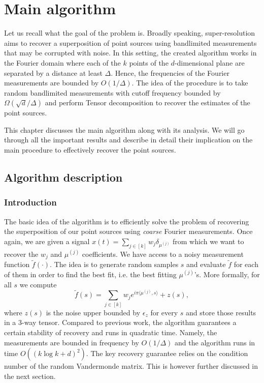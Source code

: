 \chapter{Main algorithm}
Let us recall what the goal of the problem is. Broadly speaking, super-resolution aims to recover a superposition of point sources using bandlimited measurements that may be corrupted with noise. In this setting, the created algorithm works in the Fourier domain where each of the $k$ points of the $d$-dimensional plane are separated by a distance at least $\Delta$. Hence, the frequencies of the Fourier measurements are bounded by $O(1/\Delta)$. The idea of the procedure is to take random bandlimited measurements with cutoff frequency bounded by $\Omega(\sqrt{d}/\Delta)$ and perform Tensor decomposition to recover the estimates of the point sources.\par 
This chapter discusses the main algorithm along with its analysis. We will go through all the important results and describe in detail their implication on the main procedure to effectively recover the point sources.

\section{Algorithm description}
\subsection{Introduction}
The basic idea of the algorithm is to efficiently solve the problem of recovering the superposition of our point sources using \textit{coarse} Fourier measurements. Once again, we are given a signal $x(t)=\sum_{j\in[k]}w_j\delta_{\mu^{(j)}}$ from which we want to recover the $w_j$ and $\mu^{(j)}$ coefficients. We have access to a noisy measurement function $\tilde{f}(\cdot)$. The idea is to generate random samples $s$ and evaluate $\tilde{f}$ for each of them in order to find the best fit, i.e. the best fitting $\mu^{(j)}$'s. More formally, for all $s$ we compute $$\tilde{f}(s)=\sum_{j\in[k]}w_je^{i\pi\langle\mu^{(j)},s\rangle}+z(s),$$ where $z(s)$ is the noise upper bounded by $\epsilon_z$ for every $s$ and store those results in a 3-way tensor. Compared to previous work, the algorithm guarantees a certain stability of recovery and runs in quadratic time. Namely, the measurements are bounded in frequency by $O(1/\Delta)$ and the algorithm runs in time $O((k\log k+d)^2)$. The key recovery guarantee relies on the condition number of the random Vandermonde matrix. This is however further discussed in the next section.
